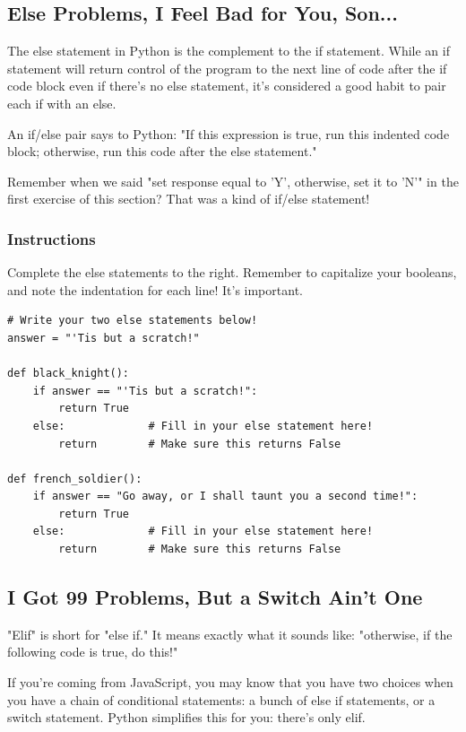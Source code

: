 \documentclass[12pt,a4paper,final,twoside,onecolumn,titlepage]{book}
\begin{document}
\subsection{Else Problems, I Feel Bad for You, Son...}

The else statement in Python is the complement to the if statement. While an if statement will return control of the program to the next line of code after the if code block even if there's no else statement, it's considered a good habit to pair each if with an else.

An if/else pair says to Python: "If this expression is true, run this indented code block; otherwise, run this code after the else statement."

Remember when we said "set response equal to 'Y', otherwise, set it to 'N'" in the first exercise of this section? That was a kind of if/else statement!

\subsubsection{Instructions}

Complete the else statements to the right. Remember to capitalize your booleans, and note the indentation for each line! It's important.

\begin{lstlisting}
# Write your two else statements below!
answer = "'Tis but a scratch!"

def black_knight():
    if answer == "'Tis but a scratch!":
        return True
    else:             # Fill in your else statement here!
        return        # Make sure this returns False

def french_soldier():
    if answer == "Go away, or I shall taunt you a second time!":
        return True
    else:             # Fill in your else statement here!
        return        # Make sure this returns False
\end{lstlisting}

\subsection{I Got 99 Problems, But a Switch Ain't One}

"Elif" is short for "else if." It means exactly what it sounds like: "otherwise, if the following code is true, do this!"

If you're coming from JavaScript, you may know that you have two choices when you have a chain of conditional statements: a bunch of else if statements, or a switch statement. Python simplifies this for you: there's only elif.
\end{document}
